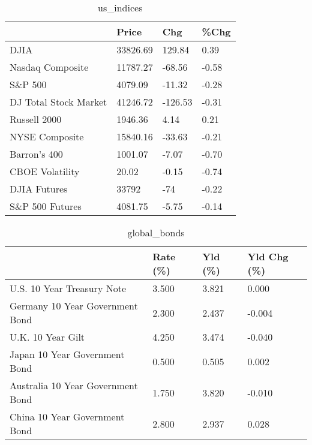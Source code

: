 \documentclass{article}%
\begin{document}
%


\begin{table}[htbp]%
\caption{us\_indices}%
\centering%
\begin{adjustbox}{width=1\textwidth}%
\begin{tabular}{llll}
\toprule
                      &    Price &     Chg &  \%Chg \\
\midrule
                 DJIA & 33826.69 &  129.84 &  0.39 \\
     Nasdaq Composite & 11787.27 &  -68.56 & -0.58 \\
              S\&P 500 &  4079.09 &  -11.32 & -0.28 \\
DJ Total Stock Market & 41246.72 & -126.53 & -0.31 \\
         Russell 2000 &  1946.36 &    4.14 &  0.21 \\
       NYSE Composite & 15840.16 &  -33.63 & -0.21 \\
         Barron's 400 &  1001.07 &   -7.07 & -0.70 \\
      CBOE Volatility &    20.02 &   -0.15 & -0.74 \\
         DJIA Futures &    33792 &     -74 & -0.22 \\
      S\&P 500 Futures &  4081.75 &   -5.75 & -0.14 \\
\bottomrule
\end{tabular}
%
\end{adjustbox}%
\end{table}

%


\begin{table}[htbp]%
\caption{global\_bonds}%
\centering%
\begin{adjustbox}{width=1\textwidth}%
\begin{tabular}{llll}
\toprule
                                  & Rate (\%) & Yld (\%) & Yld Chg (\%) \\
\midrule
       U.S. 10 Year Treasury Note &    3.500 &   3.821 &       0.000 \\
  Germany 10 Year Government Bond &    2.300 &   2.437 &      -0.004 \\
                U.K. 10 Year Gilt &    4.250 &   3.474 &      -0.040 \\
    Japan 10 Year Government Bond &    0.500 &   0.505 &       0.002 \\
Australia 10 Year Government Bond &    1.750 &   3.820 &      -0.010 \\
    China 10 Year Government Bond &    2.800 &   2.937 &       0.028 \\
\bottomrule
\end{tabular}
%
\end{adjustbox}%
\end{table}
\end{document}
